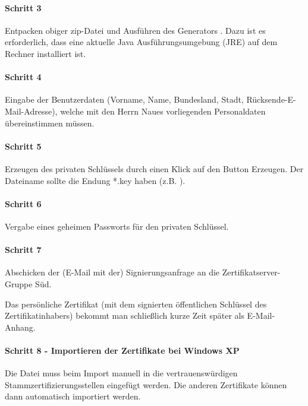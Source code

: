 \paragraph{Schritt 3}

Entpacken obiger zip-Datei und Ausführen des Generators
.  Dazu ist es erforderlich, dass eine
aktuelle Java Ausführungsumgebung (JRE) auf dem Rechner installiert ist.

\paragraph{Schritt 4}

Eingabe der Benutzerdaten (Vorname, Name, Bundesland, Stadt,
Rücksende-E-Mail-Adresse), welche mit den Herrn Naues vorliegenden Personaldaten
übereinstimmen müssen.

\paragraph{Schritt 5}

Erzeugen des privaten Schlüssels durch einen Klick auf den Button \glqq{}Erzeugen\grqq{}.
Der Dateiname sollte die Endung *.key haben (z.B. ).

\paragraph{Schritt 6}

Vergabe eines geheimen Passworts für den privaten Schlüssel.

\paragraph{Schritt 7}

Abschicken der (E-Mail mit der) Signierungsanfrage an die
Zertifikatserver-Gruppe Süd.

Das persönliche Zertifikat (mit dem signierten öffentlichen Schlüssel des
Zertifikatinhabers) bekommt man schließlich kurze Zeit später als E-Mail-Anhang.

\paragraph{Schritt 8 - Importieren der Zertifikate bei Windows XP}

Die Datei  muss beim Import manuell in die
vertrauenswürdigen Stammzertifizierungsstellen eingefügt werden. Die anderen
Zertifikate können dann automatisch importiert werden.

